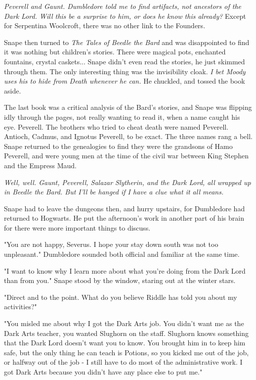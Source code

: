 \documentclass[a4paper,11pt]{article}
\begin{document}
\emph{Peverell and Gaunt. Dumbledore told me to find artifacts, not ancestors of the Dark Lord. Will this be a surprise to him, or does he know this already?} Except for Serpentina Woolcroft, there was no other link to the Founders.

Snape then turned to \emph{The Tales of Beedle the Bard} and was disappointed to find it was nothing but children's stories. There were magical pots, enchanted fountains, crystal caskets... Snape didn't even read the stories, he just skimmed through them. The only interesting thing was the invisibility cloak. \emph{I bet Moody uses his to hide from Death whenever he can.} He chuckled, and tossed the book aside.

The last book was a critical analysis of the Bard's stories, and Snape was flipping idly through the pages, not really wanting to read it, when a name caught his eye. Peverell. The brothers who tried to cheat death were named Peverell. Antioch, Cadmus, and Ignotus Peverell, to be exact. The three names rang a bell. Snape returned to the genealogies to find they were the grandsons of Hamo Peverell, and were young men at the time of the civil war between King Stephen and the Empress Maud.

\emph{Well, well. Gaunt, Peverell, Salazar Slytherin, and the Dark Lord, all wrapped up in Beedle the Bard. But I'll be hanged if I have a clue what it all means.}

Snape had to leave the dungeons then, and hurry upstairs, for Dumbledore had returned to Hogwarts. He put the afternoon's work in another part of his brain for there were more important things to discuss.

"You are not happy, Severus. I hope your stay down south was not too unpleasant." Dumbledore sounded both official and familiar at the same time.

"I want to know why I learn more about what you're doing from the Dark Lord than from you." Snape stood by the window, staring out at the winter stars.

"Direct and to the point. What do you believe Riddle has told you about my activities?"

"You misled me about why I got the Dark Arts job. You didn't want me as the Dark Arts teacher, you wanted Slughorn on the staff. Slughorn knows something that the Dark Lord doesn't want you to know. You brought him in to keep him safe, but the only thing he can teach is Potions, so you kicked me out of the job, or halfway out of the job - I still have to do most of the administrative work. I got Dark Arts because you didn't have any place else to put me."
\end{document}

